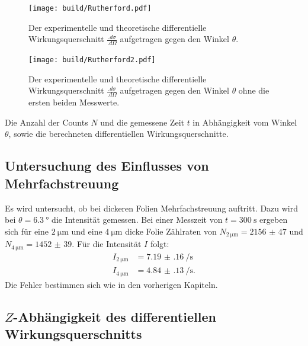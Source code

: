 \begin{figure}
\centering
\texttt{[image: build/Rutherford.pdf]}
\caption{Der experimentelle und  theoretische differentielle Wirkungsquerschnitt $\frac{.d\sigma}{.d\Omega}$ aufgetragen gegen den Winkel $\theta$.}
\label{fig:Rutherford}
\end{figure}

\begin{figure}
\centering
\texttt{[image: build/Rutherford2.pdf]}
\caption{Der experimentelle und  theoretische differentielle Wirkungsquerschnitt $\frac{.d\sigma}{.d\Omega}$ aufgetragen gegen den Winkel $\theta$ ohne die ersten beiden Messwerte.}
\label{fig:Rutherford2}
\end{figure}

\begin{table}
	\centering
	\caption{Die Anzahl der Counts $N$ und die gemessene Zeit $t$ in Abhängigkeit vom Winkel $\theta$, sowie die berechneten differentiellen Wirkungsquerschnitte.}
	
	\label{tab:dataDeg}
\end{table}

\subsection{Untersuchung des Einflusses von Mehrfachstreuung}
\label{subsec:Mehrfachstreuung}

Es wird untersucht, ob bei dickeren Folien Mehrfachstreuung auftritt. Dazu wird bei $\theta=\SI{6.3}{\degree}$ die Intensität gemessen.
Bei einer Messzeit von $t=\SI{300}{\second}$ ergeben sich für eine $\SI{2}{\micro\metre}$ und eine $\SI{4}{\micro\metre}$ dicke Folie Zählraten von $N_{\SI{2}{\micro\metre}}=\num{2156(47)}$ und $N_{\SI{4}{\micro\metre}}=\num{1452(39)}$.
Für die Intensität $I$ folgt:
\begin{align*}
I_{\SI{2}{\micro\metre}} &= \SI{7.19(16)}{\per\second}\\
I_{\SI{4}{\micro\metre}} &= \SI{4.84(13)}{\per\second}\text{.}
\end{align*}
Die Fehler bestimmen sich wie in den vorherigen Kapiteln.

\subsection{$Z$-Abhängigkeit des differentiellen Wirkungsquerschnitts}

